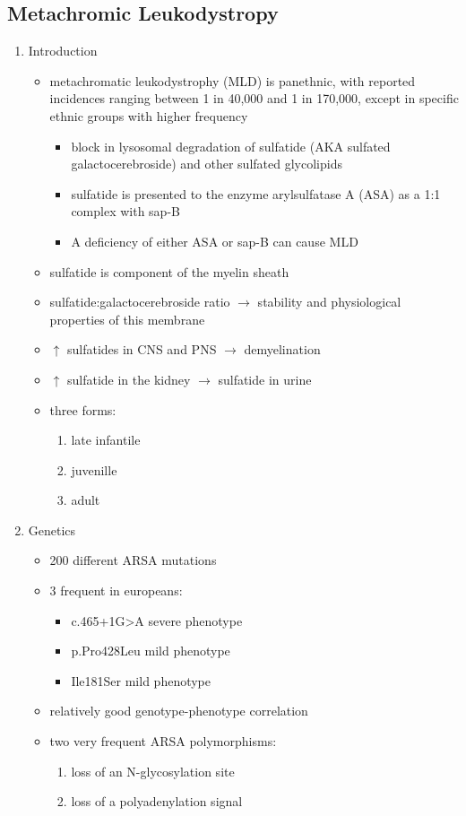 \documentclass{scrartcl}
\begin{document}
\subsection{Metachromic Leukodystropy}
\label{sec:orgbaffef1}
\begin{enumerate}
\item Introduction
\label{sec:org2f457aa}

\begin{itemize}
\item metachromatic leukodystrophy (MLD) is panethnic, with reported
incidences ranging between 1 in 40,000 and 1 in 170,000, except in
specific ethnic groups with higher frequency
\begin{itemize}
\item block in lysosomal degradation of sulfatide (AKA sulfated
galactocerebroside) and other sulfated glycolipids
\item sulfatide is presented to the enzyme arylsulfatase A (ASA) as a
1:1 complex with sap-B
\item A deficiency of either ASA or sap-B can cause MLD
\end{itemize}
\item sulfatide is component of the myelin sheath
\item sulfatide:galactocerebroside ratio \(\to\) stability and physiological properties of this membrane
\item \(\uparrow\) sulfatides in CNS and PNS \(\to\) demyelination
\item \(\uparrow\) sulfatide in the kidney \(\to\) sulfatide in urine

\item three forms:
\begin{enumerate}
\item late infantile
\item juvenille
\item adult
\end{enumerate}
\end{itemize}


\item Genetics
\label{sec:orgfe111ef}
\begin{itemize}
\item 200 different ARSA mutations
\item 3 frequent in europeans:
\begin{itemize}
\item c.465+1G>A severe phenotype
\item p.Pro428Leu mild phenotype
\item Ile181Ser mild phenotype
\end{itemize}
\item relatively good genotype-phenotype correlation
\item two very frequent ARSA polymorphisms:
\begin{enumerate}
\item loss of an N-glycosylation site
\item loss of a polyadenylation signal
\end{enumerate}


\end{itemize}
\end{enumerate}
\end{document}
